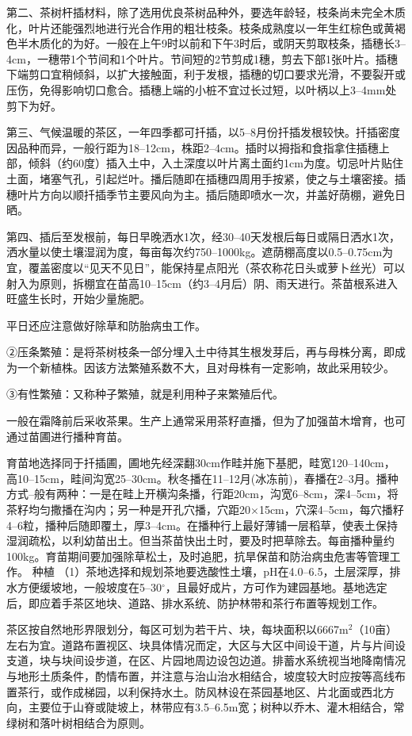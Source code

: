 \documentclass{ctexbook}
\begin{document}
第二、茶树杆插材料，除了选用优良茶树品种外，要选年龄轻，枝条尚未完全木质化，叶片还能强烈地进行光合作用的粗壮枝条。枝条成熟度以一年生红棕色或黄褐色半木质化的为好。一般在上午9时以前和下午3时后，或阴天剪取枝条，插穗长3--4cm，一穗带1个节间和1个叶片。节间短的2节剪成1穗，剪去下部1张叶片。插穗下端剪口宜稍倾斜，以扩大接触面，利于发根，插穗的切口要求光滑，不要裂开或压伤，免得影响切口愈合。插穗上端的小桩不宜过长过短，以叶柄以上3--4mm处剪下为好。

第三、气候温暖的茶区，一年四季都可扦插，以5--8月份扦插发根较快。扦插密度因品种而异，一般行距为18--12cm，株距2--4cm。插时以拇指和食指拿住插穗上部，倾斜（约60度）插入土中，入土深度以叶片离土面约1cm为度。切忌叶片贴住土面，堵塞气孔，引起烂叶。播后随即在插穗四周用手按紧，使之与土壤密接。插穗叶片方向以顺扦插季节主要风向为主。插后随即喷水一次，并盖好荫棚，避免日晒。

第四、插后至发根前，每日早晚洒水1次，经30--40天发根后每日或隔日洒水1次，洒水量以使土壤湿润为度，每亩每次约750--1000kg。遮荫棚高度以0.5--0.75cm为宜，覆盖密度以“见天不见日”，能保持星点阳光（茶农称花日头或萝卜丝光）可以射入为原则，拆棚宜在苗高10--15cm（约3--4月后）阴、雨天进行。茶苗根系进入旺盛生长时，开始少量施肥。

平日还应注意做好除草和防胎病虫工作。

②压条繁殖：是将茶树枝条一郃分埋入土中待其生根发芽后，再与母株分离，即成为一个新植株。因该方法繁殖系数不大，且对母株有一定影响，故此采用较少。

③有性繁殖：又称种子繁殖，就是利用种子来繁殖后代。

一般在霜降前后采收茶果。生产上通常采用茶籽直播，但为了加强苗木增育，也可通过苗圃进行播种育苗。

育苗地选择同于扦插圃，圃地先经深翻30cm作畦并施下基肥，畦宽120--140cm，高10--15cm，畦间沟宽25--30cm。秋冬播在11--12月(冰冻前)，春播在2--3月。播种方式--般有两种：一是在畦上开横沟条播，行距20cm，沟宽6--8cm，深4--5cm，将茶籽均匀撒播在沟内；另一种是开孔穴播，穴距20$\times$15cm，穴深4--5cm，每穴播籽4--6粒，播种后随即覆土，厚3--4cm。在播种行上最好薄铺一层稻草，使表土保持湿润疏松，以利幼苗出土。但当茶苗快出土时，要及时把草除去。每亩播种量约100kg。育苗期间要加强除草松土，及时追肥，抗旱保苗和防治病虫危害等管理工作。
种植
（1）茶地选择和规划茶地要选酸性土壤，pH在4.0--6.5，土层深厚，排水方便缓坡地，一般坡度在5--30$^{\circ}$，且最好成片，方可作为建园基地。基地选定后，即应着手茶区地块、道路、排水系统、防护林带和茶行布置等规划工作。

茶区按自然地形界限划分，每区可划为若干片、块，每块面积以6667m$^2$（10亩）左右为宜。道路布置视区、块具体情况而定，大区与大区中间设干道，片与片间设支道，块与块间设步道，在区、片园地周边设包边道。排蓄水系统视当地降南情况与地形土质条件，酌情布置，并注意与治山治水相结合，坡度较大时应按等高线布置茶行，或作成梯园，以利保持水土。防风林设在茶园基地区、片北面或西北方向，主要位于山脊或陡坡上，林带应有3.5--6.5m宽；树种以乔木、灌木相结合，常绿树和落叶树相结合为原则。
\end{document}
